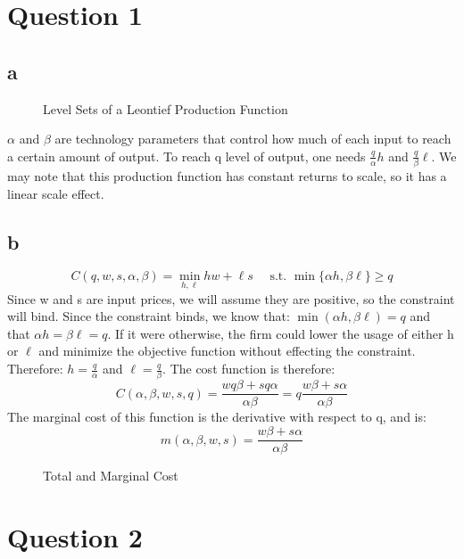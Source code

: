 \documentclass[12pt]{paper}
\begin{document}
\section*{Question 1}

\subsection*{a}


\begin{figure}[H]
  \centering
  
  \caption{Level Sets of a Leontief Production Function}
\end{figure}


$\alpha$ and $\beta$ are technology parameters that control how much of each input to
reach a certain amount of output. To reach q level of output, one needs
$\frac{q}{\alpha} h$ and $\frac{q}{\beta} \ell$. We may note that this production function
has constant returns to scale, so it has a linear scale effect.

\subsection*{b}


$$C( q, w,s,\alpha,\beta) = \min_{h,\ell}   hw + \ell s \quad \text{ s.t. }\min\{ \alpha h, \beta \ell \} \geq q$$
Since w and s are input prices, we will assume they are positive, so the
constraint will bind. Since the constraint binds, we know that: $\min( \alpha h, \beta \ell )
= q$ and that $\alpha h = \beta \ell = q$. If it were otherwise, the firm could lower the usage
of either h or $\ell$ and minimize the objective function without effecting the
constraint. Therefore: $h = \frac{q}{\alpha}$ and $\ell = \frac{q}{\beta}$. The cost
function is therefore: $$C( \alpha, \beta, w, s, q ) = \frac{wq\beta+ sq\alpha}{\alpha\beta} = q \frac{w\beta +
  s\alpha}{\alpha\beta}$$ \newline
The marginal cost of this function is the derivative with respect to
q, and is: $$m( \alpha, \beta, w, s ) =  \frac{w\beta + s\alpha}{\alpha\beta}$$


\begin{figure}[H]
  \centering
  
  \caption{Total and Marginal Cost}
\end{figure}

\section*{Question 2}
\end{document}
